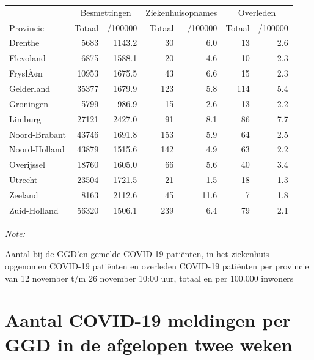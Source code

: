 \documentclass[
  english,
  man,floatsintext]{apa6}
\begin{document}
\begin{table}
\centering
\begin{threeparttable}
\begin{tabular}{lrrrrrr}
\toprule
\multicolumn{1}{c}{ } & \multicolumn{2}{c}{Besmettingen} & \multicolumn{2}{c}{Ziekenhuisopnames} & \multicolumn{2}{c}{Overleden} \\
\cmidrule(l{3pt}r{3pt}){2-3} \cmidrule(l{3pt}r{3pt}){4-5} \cmidrule(l{3pt}r{3pt}){6-7}
Provincie & Totaal & /100000 & Totaal & /100000 & Totaal & /100000\\
\midrule
Drenthe & 5683 & 1143.2 & 30 & 6.0 & 13 & 2.6\\
Flevoland & 6875 & 1588.1 & 20 & 4.6 & 10 & 2.3\\
FryslÃ¢n & 10953 & 1675.5 & 43 & 6.6 & 15 & 2.3\\
Gelderland & 35377 & 1679.9 & 123 & 5.8 & 114 & 5.4\\
Groningen & 5799 & 986.9 & 15 & 2.6 & 13 & 2.2\\
Limburg & 27121 & 2427.0 & 91 & 8.1 & 86 & 7.7\\
Noord-Brabant & 43746 & 1691.8 & 153 & 5.9 & 64 & 2.5\\
Noord-Holland & 43879 & 1515.6 & 142 & 4.9 & 63 & 2.2\\
Overijssel & 18760 & 1605.0 & 66 & 5.6 & 40 & 3.4\\
Utrecht & 23504 & 1721.5 & 21 & 1.5 & 18 & 1.3\\
Zeeland & 8163 & 2112.6 & 45 & 11.6 & 7 & 1.8\\
Zuid-Holland & 56320 & 1506.1 & 239 & 6.4 & 79 & 2.1\\
\bottomrule
\end{tabular}
\begin{tablenotes}
\item \textit{Note: } 
\item Aantal bij de GGD’en gemelde COVID-19 patiënten, in het ziekenhuis opgenomen COVID-19 patiënten en overleden COVID-19 patiënten per provincie van 12 november t/m 26 november 10:00 uur, totaal en per 100.000 inwoners
\end{tablenotes}
\end{threeparttable}
\end{table}

\newpage

\hypertarget{aantal-covid-19-meldingen-per-ggd-in-de-afgelopen-twee-weken}{%
\section{Aantal COVID-19 meldingen per GGD in de afgelopen twee weken}\label{aantal-covid-19-meldingen-per-ggd-in-de-afgelopen-twee-weken}}
\end{document}
